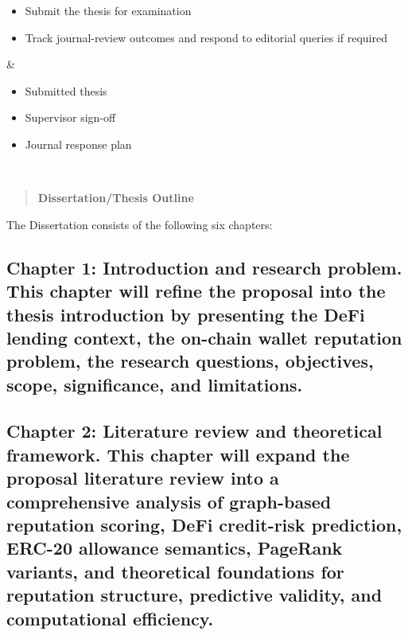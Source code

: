 \documentclass[
]{article}
\begin{document}
{\begin{longtable}[]
\begin{minipage}[t]{\linewidth}
\begin{itemize}
  Obtain final supervisor sign-off
\item
  Submit the thesis for examination
\item
  Track journal-review outcomes and respond to editorial queries if required
\end{itemize}
\end{minipage} & \begin{minipage}[t]{\linewidth}\centering
\begin{itemize}
\item
  Submitted thesis
\item
  Supervisor sign-off
\item
  Journal response plan
\end{itemize}
\end{minipage} \\
\end{longtable}
}

\begin{quote}
\textbf{Dissertation/Thesis Outline}
\end{quote}

The Dissertation consists of the following six chapters:

\subsection{Chapter 1: Introduction and research problem. This chapter will refine the proposal into the thesis introduction by presenting the DeFi lending context, the on-chain wallet reputation problem, the research questions, objectives, scope, significance, and limitations.}\label{chapter-1-introduction-and-research-problem.-this-chapter-will-refine-the-proposal-into-the-thesis-introduction-by-presenting-the-defi-lending-context-the-on-chain-wallet-reputation-problem-the-research-questions-objectives-scope-significance-and-limitations.}

\subsection{Chapter 2: Literature review and theoretical framework. This chapter will expand the proposal literature review into a comprehensive analysis of graph-based reputation scoring, DeFi credit-risk prediction, ERC-20 allowance semantics, PageRank variants, and theoretical foundations for reputation structure, predictive validity, and computational efficiency.}\label{chapter-2-literature-review-and-theoretical-framework.-this-chapter-will-expand-the-proposal-literature-review-into-a-comprehensive-analysis-of-graph-based-reputation-scoring-defi-credit-risk-prediction-erc-20-allowance-semantics-pagerank-variants-and-theoretical-foundations-for-reputation-structure-predictive-validity-and-computational-efficiency.}
\end{document}
